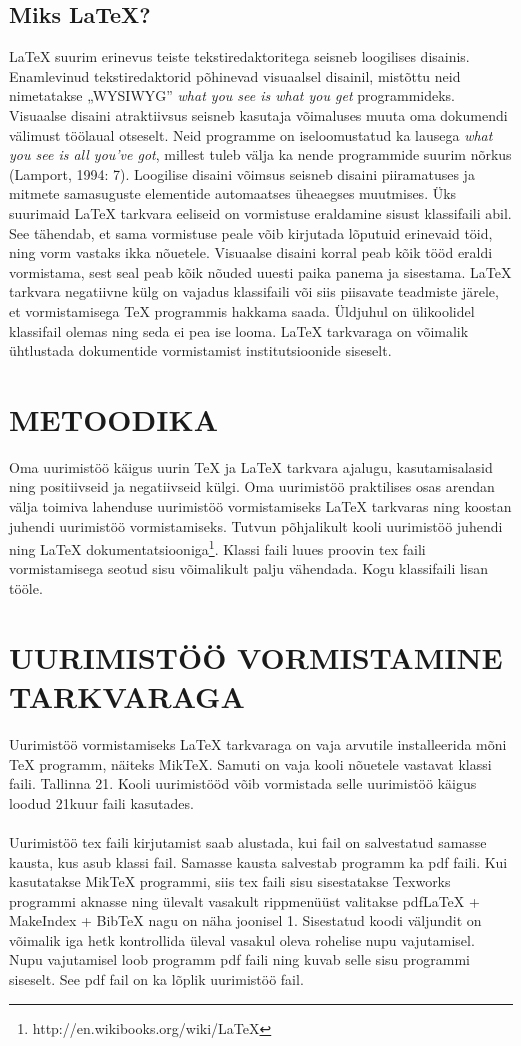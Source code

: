 \documentclass{21kuur}
\begin{document}
\section{Miks LaTeX?}
LaTeX suurim erinevus teiste tekstiredaktoritega seisneb loogilises disainis. Enamlevinud tekstiredaktorid põhinevad visuaalsel disainil, mistõttu neid nimetatakse „WYSIWYG” {\it what you see is what you get} programmideks. Visuaalse disaini atraktiivsus seisneb kasutaja võimaluses muuta oma dokumendi välimust töölaual otseselt. Neid programme on iseloomustatud ka lausega {\it what you see is all you've got}, millest tuleb välja ka nende programmide suurim nõrkus (Lamport, 1994: 7). Loogilise disaini võimsus seisneb disaini piiramatuses ja mitmete samasuguste elementide automaatses üheaegses muutmises. Üks suurimaid LaTeX tarkvara eeliseid on vormistuse eraldamine sisust klassifaili abil. See tähendab, et sama vormistuse peale võib kirjutada lõputuid erinevaid töid, ning vorm vastaks ikka nõuetele. Visuaalse disaini korral peab kõik tööd eraldi vormistama, sest seal peab kõik nõuded uuesti paika panema ja sisestama. LaTeX tarkvara negatiivne külg on vajadus klassifaili või siis piisavate teadmiste järele, et vormistamisega TeX programmis hakkama saada. Üldjuhul on ülikoolidel klassifail olemas ning seda ei pea ise looma. LaTeX tarkvaraga on võimalik ühtlustada dokumentide vormistamist institutsioonide siseselt.

\chapter{METOODIKA}
Oma uurimistöö käigus uurin TeX ja LaTeX tarkvara ajalugu, kasutamisalasid ning positiivseid ja negatiivseid külgi. Oma uurimistöö praktilises osas arendan välja toimiva lahenduse uurimistöö vormistamiseks LaTeX tarkvaras ning koostan juhendi uurimistöö vormistamiseks. Tutvun põhjalikult kooli uurimistöö juhendi ning LaTeX dokumentatsiooniga\footnote{http://en.wikibooks.org/wiki/LaTeX}. Klassi faili luues proovin tex faili vormistamisega seotud sisu võimalikult palju vähendada. Kogu klassifaili lisan tööle.

\chapter{UURIMISTÖÖ VORMISTAMINE \latex TARKVARAGA}
Uurimistöö vormistamiseks LaTeX tarkvaraga on vaja arvutile installeerida mõni TeX programm, näiteks MikTeX. Samuti on vaja kooli nõuetele vastavat klassi faili. Tallinna 21. Kooli uurimistööd võib vormistada selle uurimistöö käigus loodud 21kuur faili kasutades.
\\\\Uurimistöö tex faili kirjutamist saab alustada, kui fail on salvestatud samasse kausta, kus asub klassi fail. Samasse kausta salvestab programm ka pdf faili. Kui kasutatakse MikTeX programmi, siis tex faili sisu sisestatakse Texworks programmi aknasse ning ülevalt vasakult rippmenüüst valitakse pdfLaTeX + MakeIndex + BibTeX nagu on näha joonisel 1. Sisestatud koodi väljundit on võimalik iga hetk kontrollida üleval vasakul oleva rohelise nupu vajutamisel. Nupu vajutamisel loob programm pdf faili ning kuvab selle sisu programmi siseselt. See pdf fail on ka lõplik uurimistöö fail.
\end{document}

